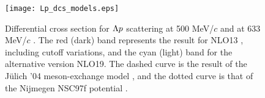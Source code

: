 \begin{figure}[h]
 \begin{center}
   \texttt{[image: Lp\_dcs\_models.eps]}
   \caption{Differential cross section for $\Lambda p$ scattering at 500 MeV/$c$ and at 633 MeV/$c$ \cite{chiEFT-2020}. The red (dark) band represents the result for NLO13 \cite{chiEFT-2013}, including cutoff variations, and the cyan (light) band for the alternative version NLO19. The dashed curve is the result of the J\"{u}lich '04 meson-exchange model \cite{chiEFT-2005}, and the dotted curve is that of the Nijmegen NSC97f potential \cite{NSC97f}.} 
   \label{fig-Lp_dcs_models}
 \end{center}
\end{figure}


\clearpage
